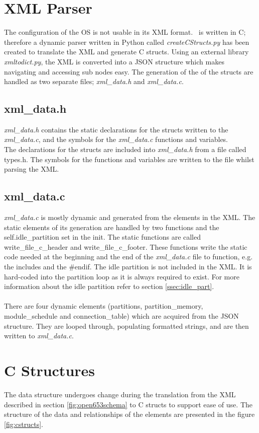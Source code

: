 \section{XML Parser}
The configuration of the OS is not usable in its XML format.
\OSname\ is written in C; therefore a dynamic parser written in Python called
\textit{createCStructs.py} has been created to translate the XML and generate C structs.
Using an external library \textit{xmltodict.py}\cite{xml2dict},
the XML is converted into a JSON structure which makes navigating and accessing
sub nodes easy.
The generation of the of the structs are handled as two separate files; \textit{xml\_data.h} and \textit{xml\_data.c}.


\subsection{xml\_data.h}
\textit{xml\_data.h} contains the static declarations for the structs written to
the \textit{xml\_data.c}, and the symbols for the \textit{xml\_data.c} functions and variables.
\\
The declarations for the structs are included into \textit{xml\_data.h} from a file called types.h.
The symbols for the functions and variables are written to the file whilst parsing the XML.


\subsection{xml\_data.c}
\textit{xml\_data.c} is mostly dynamic and generated from the elements in the XML.
The static elements of its generation are handled by two functions and the self.idle\_partition set in the init.
The static functions are called write\_file\_c\_header and write\_file\_c\_footer.
These functions write the static code needed at the beginning and the end of the
\textit{xml\_data.c} file to function, e.g. the includes and the \#endif.
The idle partition is not included in the XML.
It is hard-coded into the partition loop as it is always required to exist.
For more information about the idle partition refer to section \ref{ssec:idle_part}.
\\\\
There are four dynamic elements (partitions, partition\_memory, module\_schedule and connection\_table)
which are acquired from the JSON structure.
They are looped through, populating formatted strings,
and are then written to \textit{xml\_data.c}.


\section{C Structures}
The data structure undergoes change during the translation from the XML described in
section \ref{fig:open653schema} to C structs to support ease of use.
The structure of the data and relationships of the elements are presented in the
figure \ref{fig:cstructs}.

